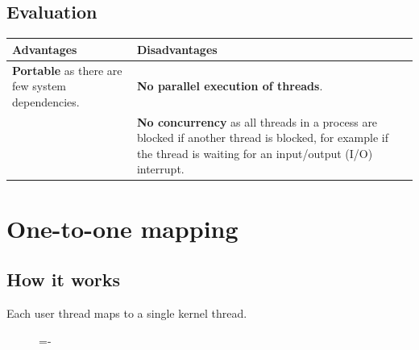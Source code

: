 \documentclass[a4paper]{systems-software}
\begin{document}
\subsection*{Evaluation}

\begin{longtabu} to \textwidth {|X[1,l]|X[1,l]|}
    \hline
    \textbf{Advantages} & \textbf{Disadvantages}
    \\ \hline
    \textbf{Portable} as there are few system dependencies.
    &
    \textbf{No parallel execution of threads}.
    \\ \hline
    &
    \textbf{No concurrency} as all threads in a process are blocked if another thread is blocked, for example if the thread is waiting for an input/output (I/O) interrupt.
	\\ \hline
\end{longtabu}


\newpage

\section*{One-to-one mapping}

\subsection*{How it works}

Each user thread maps to a single kernel thread.

\begin{figure}[H]
  \lineskip=-\fboxrule
\end{figure}
\end{document}
